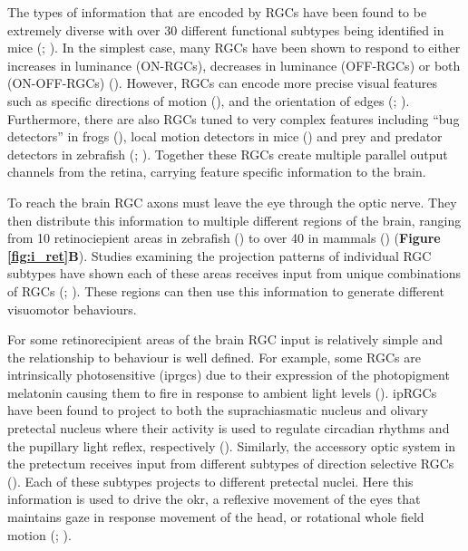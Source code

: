 The types of information that are encoded by RGCs have been found to be extremely diverse with over 30 different functional subtypes being identified in mice (\cite{Sanes2015TheClassification}; \cite{Baden2016TheMouse}). In the simplest case, many RGCs have been shown to respond to either increases in luminance (ON-RGCs), decreases in luminance (OFF-RGCs) or both (ON-OFF-RGCs) (\cite{Hartline1938TheRetina, Lettvin1959WhatBrain, Barlow1953}). However, RGCs can encode more precise visual features such as specific directions of motion (\cite{BARLOW1963, Oyster1967,Lettvin1959WhatBrain}), and the orientation of edges (\cite{Levick1967ReceptiveRetina}; \cite{Maturana1963DirectionalRetina}). Furthermore, there are also RGCs tuned to very complex features including “bug detectors” in frogs (\cite{Barlow1953, Lettvin1959WhatBrain}), local motion detectors in mice (\cite{Zhang2012}) and prey and predator detectors in zebrafish (\cite{Semmelhack2014}; \cite{Temizer2015}). Together these RGCs create multiple parallel output channels from the retina, carrying feature specific information to the brain.

To reach the brain RGC axons must leave the eye through the optic nerve. They then distribute this information to multiple different regions of the brain, ranging from 10 retinociepient areas in zebrafish (\cite{Robles2014}) to over 40 in mammals (\cite{Morin2014RetinofugalMouse}) (\textbf{Figure \ref{fig:i_ret}B}). Studies examining the projection patterns of individual RGC subtypes have shown each of these areas receives input from unique combinations of RGCs (\cite{Robles2014}; \cite{Dhande2014RetinalProcessing}). These regions can then use this information to generate different visuomotor behaviours. 

For some retinorecipient areas of the brain RGC input is relatively simple and the relationship to behaviour is well defined. For example, some RGCs are intrinsically photosensitive  (\acrshort{iprgc}s) due to their expression of the photopigment melatonin causing them to  fire in response to ambient light levels (\cite{Hattar2002Melanopsin-containingPhotosensitivity, Berson2002PhototransductionClock}). ipRGCs have been found to project to both the suprachiasmatic nucleus and olivary pretectal nucleus where their activity is used to regulate circadian rhythms and the pupillary light reflex, respectively (\cite{Pickard1985BifurcatingThalamus, Hattar2006CentralMouse, Guler2008MelanopsinVision, Chen2011PhotoentrainmentIpRGCs}). Similarly, the accessory optic system in the pretectum receives input from different subtypes of direction selective RGCs (\cite{Simpson1984TheSystem, Hoffmann1991FunctionalMonkeys, Brodsky2012TheStrabismus}). Each of these subtypes projects to different pretectal nuclei. Here this information is used to drive the \gls{okr}, a reflexive movement of the eyes that maintains gaze in response movement of the head, or rotational whole field motion (\cite{Dhande2014RetinalProcessing}; \cite{Distler2011VisualMonkeys}). 


